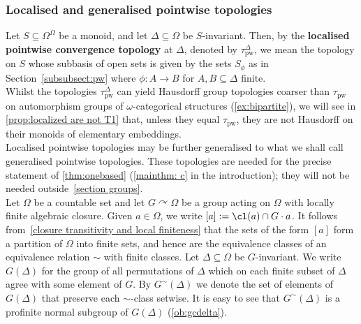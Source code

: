 \documentclass{article}
\theoremstyle{remark}
\theoremstyle{definition}
\def\acts{\curvearrowright}
\newcommand{\nn}[0]{S}%
\newcommand{\pw}[0]{\tau_{\mathrm{pw}}}
\newcommand{\gc}[0]{G^{\sim}}
\begin{document}
{{{{     
  


 \subsubsection{Localised and generalised pointwise topologies}\label{subsub:localised}




{Let $S\subseteq \Omega^\Omega$ be a monoid, and let  $\Delta\subseteq \Omega$ be $S$-invariant. Then, by the \textbf{localised pointwise convergence topology} at $\Delta$, denoted by  $\pw^\Delta$, we mean the topology on $S$ whose subbasis of open sets is given by the 
sets ${\nn}_\phi$ as in Section~\ref{subsubsect:pw} where $\phi\colon A\to B$ for  $A,B\subseteq \Delta$ finite.}\\
  
{Whilst the topologies $\pw^\Delta$ can yield Hausdorff group topologies coarser than $\pw$ on automorphism groups of $\omega$-categorical structures (\cref{ex:bipartite}), we will see in \cref{prop:localized are not T1} that, {unless they equal $\pw$,} they 
are %
{not}
Hausdorff on their monoids of elementary embeddings.}\\

Localised pointwise topologies may be further generalised to what we shall call generalised pointwise topologies. 
 These topologies are needed for the precise statement of \cref{thm:onebased} (\cref{mainthm: c} in the introduction); they will not be needed outside~\cref{section groups}.\\

  
 

 
 
Let $\Omega$ be a countable set and let $G\acts\Omega$ be a group acting on $\Omega$ with locally finite algebraic closure.
  Given $a\in\Omega$, we write $[a]:=\cl(a)\cap G\cdot a$. {It follows from~\cref{closure transitivity and local finiteness} that the sets of the form $[a]$ form a partition of $\Omega$ into finite sets, and hence are the equivalence classes of an equivalence relation $\sim$ with finite classes.} 
	    {Let $\Delta\subseteq \Omega$ be $G$-invariant.}
    {We write $G(\Delta)$ for the group of all permutations of $\Delta$ which on each finite subset of $\Delta$ agree with some element of $G$.}  %
     {By $\gc(\Delta)$ we denote the set of elements of $G(\Delta)$ that %
     {preserve each $\sim$-class setwise.} %
     It is easy to see that $\gc(\Delta)$ is a profinite normal subgroup of $G(\Delta)$ (\cref{ob:gcdelta}).}






}}}}
\end{document}
